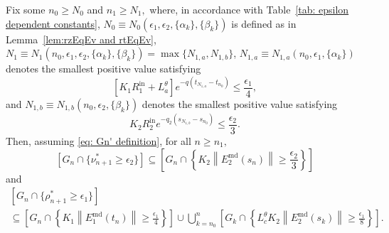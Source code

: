 \documentclass[usenames,dvipsnames,final,12pt]{colt2018} %
\newcommand{\et}{\epsilon_1}
\newcommand{\Rti}{R_1^{\textrm{in}}}
\newcommand{\rtS}{\rho^{*}}
\newcommand{\Et}{E_1}
\newcommand{\Kt}{K_1}
\newcommand{\EtM}{\Et^{\md}}
\newcommand{\Lt}[1]{L^{\theta}_{#1}}
\newcommand{\lz}{q_2}
\newcommand{\ez}{\epsilon_2}
\newcommand{\Rzi}{R_2^{\textrm{in}}}
\newcommand{\rzS}{\nu^{*}}
\newcommand{\Ez}{E_2}
\newcommand{\Kz}{K_2}
\newcommand{\EzM}{\Ez^{\md}}
\newcommand{\n}[1]{N_{1,#1}}
\newcommand{\lm}{q}
\newcommand{\md}{\text{md}}
\newcommand{\tI}[1]{t_{#1}}
\newcommand{\sI}[1]{s_{#1}}
\newcommand{\norm}[1]{\left\lVert#1\right\rVert}
\newcommand{\gal}[1]{#1}
\begin{document}
\begin{lemma}
\label{lem:rzSEqEv and rtSEqEv}
{
Fix some $n_0 \geq N_0$ and $n_1 \geq N_1,$
where, in accordance with Table~\ref{tab: epsilon dependent constants}, $N_0 \equiv N_0(\et,\ez,\{\alpha_k\},\{\beta_k\})$ is defined as in Lemma~\ref{lem:rzEqEv and rtEqEv},
$N_1 \equiv N_1(n_0,\et,\ez,\{\alpha_k\},\{\beta_k\}) = \max\{\n{a},\n{b}\}$,
$\n{a} \equiv \n{a}(n_0,\et, \{\alpha_k\})$
denotes the smallest positive value satisfying
\begin{equation}
\label{eq: na def}
[\Kt \Rti + \Lt{a}] e^{-\lm(\tI{\n{a}} - \tI{n_0})} \leq \frac{\et}{4},
\end{equation}
and
$\n{b} \equiv \n{b}(n_0,\ez, \{\beta_k\})$
denotes the smallest positive value satisfying
\begin{equation}
\label{eq: nb def}
\Kz \Rzi e^{-\lz (\sI{\n{b}} - \sI{n_0})} \leq \frac{\ez}{3}.
\end{equation}
Then\gal{, assuming \eqref{eq: Gn' definition},} for all $n \geq n_1,$
}
%
\begin{equation}
\label{eq:rzSEqEv}
[ G_n \cap \{\rzS_{n + 1} \geq \ez\}]
\subseteq \left[ G_n \cap \left\{\Kz \norm{\EzM(\sI{n})} \geq \frac{\ez}{3}\right\}\right]
\end{equation}
and
\begin{multline}
\label{eq:rtSEqEv}
[ G_n \cap \{\rtS_{n + 1} \geq \et\}] \\
\subseteq \left[ G_n \cap \left\{\Kt \norm{\EtM(\tI{n})} \geq \frac{\et}{4}\right\}\right] \cup \bigcup_{k = n_0}^{n} \left[ G_k \cap \left\{ \Lt{c} \Kz \norm{\EzM(\sI{k})} \geq \frac{\et}{8}\right\}\right].
\end{multline}
\end{lemma}
\end{document}
